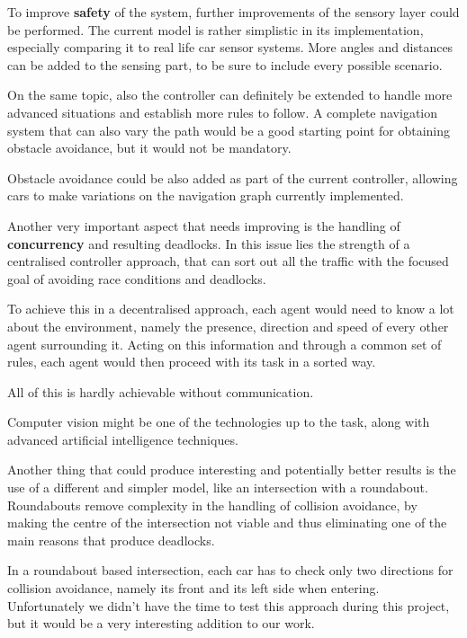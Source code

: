 To improve \textbf{safety} of the system, further improvements of the sensory layer could be performed.
The current model is rather simplistic in its implementation, especially comparing it to real life car sensor systems.
More angles and distances can be added to the sensing part, to be sure to include every possible scenario.

On the same topic, also the controller can definitely be extended to handle more advanced situations and establish more rules to follow. 
A complete navigation system that can also vary the path would be a good starting point for obtaining obstacle avoidance, but it would not be mandatory.

Obstacle avoidance could be also added as part of the current controller, allowing cars to make variations on the navigation graph currently implemented.
\newline

Another very important aspect that needs improving is the handling of \textbf{concurrency} and resulting deadlocks.
In this issue lies the strength of a centralised controller approach, that can sort out all the traffic with the focused goal of avoiding race conditions and deadlocks.

To achieve this in a decentralised approach, each agent would need to know a lot about the environment, namely the presence, direction and speed of every other agent surrounding it.
Acting on this information and through a common set of rules, each agent would then proceed with its task in a sorted way.

All of this is hardly achievable without communication.

Computer vision might be one of the technologies up to the task, along with advanced artificial intelligence techniques.
\newline

Another thing that could produce interesting and potentially better results is the use of a different and simpler model, like an intersection with a roundabout.
Roundabouts remove complexity in the handling of collision avoidance, by making the centre of the intersection not viable and thus eliminating one of the main reasons that produce deadlocks.

In a roundabout based intersection, each car has to check only two directions for collision avoidance, namely its front and its left side when entering.
Unfortunately we didn't have the time to test this approach during this project, but it would be a very interesting addition to our work.
\newline

